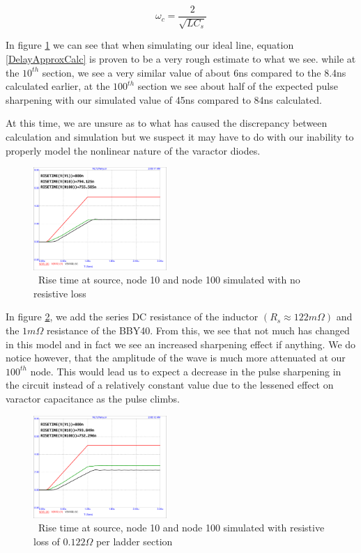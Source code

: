 \documentclass[journal]{IEEEtran} \usepackage[english]{babel}
\begin{document}
\begin{equation} \label{NLTLCutoff}
    \omega_{c} = \frac{2}{\sqrt{ LC_{s} } }
\end{equation}

In figure \ref{fig:riseNoLoss} we can see that when simulating our ideal line,
equation \ref{DelayApproxCalc} is proven to be a very rough estimate to what we
see. while at the $10^{th}$ section, we see a very similar value of about 6ns
compared to the 8.4ns calculated earlier, at the $100^{th}$ section we see about
half of the expected pulse sharpening with our simulated value of 45ns compared
to 84ns calculated.

At this time, we are unsure as to what has caused the discrepancy between
calculation and simulation but we suspect it may have to do with our inability
to properly model the nonlinear nature of the varactor diodes.

\begin{figure}[htb]
\centering
\includegraphics[width=0.45\textwidth,page = 1]{risetimeGuessNOLoss.pdf}
\caption{\ Rise time at source, node 10 and node 100 simulated with no resistive loss
}\label{fig:riseNoLoss}
\end{figure}

In figure \ref{fig:riseWithLoss}, we add the series DC resistance of the
inductor $(R_s \approx 122m\Omega)$ and the $1m\Omega$ resistance of the BBY40. 
From this, we see that not much has changed in this model and in fact we see an
increased sharpening effect if anything. We do notice however, that the
amplitude of the wave is much more attenuated at our $100^{th}$ node. This would
lead us to expect a decrease in the pulse sharpening in the circuit instead of a
relatively constant value due to the lessened effect on varactor capacitance as
the pulse climbs.

\begin{figure}[htb]
\centering
\includegraphics[width=0.45\textwidth,page = 1]{risetimeGuessWLoss.pdf}
\caption{\ Rise time at source, node 10 and node 100 simulated with resistive loss of $0.122\Omega$ per ladder section 
}\label{fig:riseWithLoss}
\end{figure}
\end{document}
